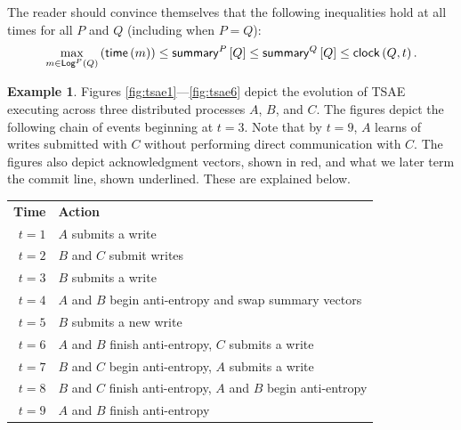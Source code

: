 \documentclass[]             %
{NASA}                       %
\theoremstyle{definition}
\newtheorem{example}[theorem]{Example}
\begin{document}
The reader should convince themselves that the following inequalities
hold at all times for all $P$ and $Q$ (including when $P = Q$):
\[
  \max_{m \in \mathsf{Log}^{P}\left(Q\right)}\left({\mathsf{time}\left(m\right)}\right) \leq \mathsf{summary}^{P}\left[Q\right] \leq \mathsf{summary}^{Q}\left[Q\right] \leq \mathsf{clock}\left(Q,t\right).
\]

\begin{example}
  \label{ex:tsae}
  Figures \ref{fig:tsae1}---\ref{fig:tsae6} depict the evolution of
  TSAE executing across three distributed processes $A$, $B$, and
  $C$. The figures depict the following chain of events beginning at
  $t = 3$. Note that by $t = 9$, $A$ learns of writes submitted with
  $C$ without performing direct communication with $C$. The figures
  also depict acknowledgment vectors, shown in red, and what we later
  term the commit line, shown underlined. These are explained below.

  \begin{centering}
    \begin{tabular}{rl}\\
      \textbf{Time}    & \textbf{Action} \\
      $t = 1$   & $A$ submits a write                                            \\
      $t = 2$   & $B$ and $C$ submit writes                                      \\
      $t = 3$   & $B$ submits a write                                            \\
      $t = 4$ & $A$ and $B$ begin anti-entropy and swap summary vectors \\
      $t = 5$ & $B$ submits a new write  \\
      $t = 6$ & $A$ and $B$ finish anti-entropy, $C$ submits a write \\
      $t = 7$ & $B$ and $C$ begin anti-entropy, $A$ submits a write \\
      $t = 8$ & $B$ and $C$ finish anti-entropy, $A$ and $B$ begin anti-entropy \\
      $t = 9$ & $A$ and $B$ finish anti-entropy
    \end{tabular}
  \end{centering}
\end{example}
\end{document}
